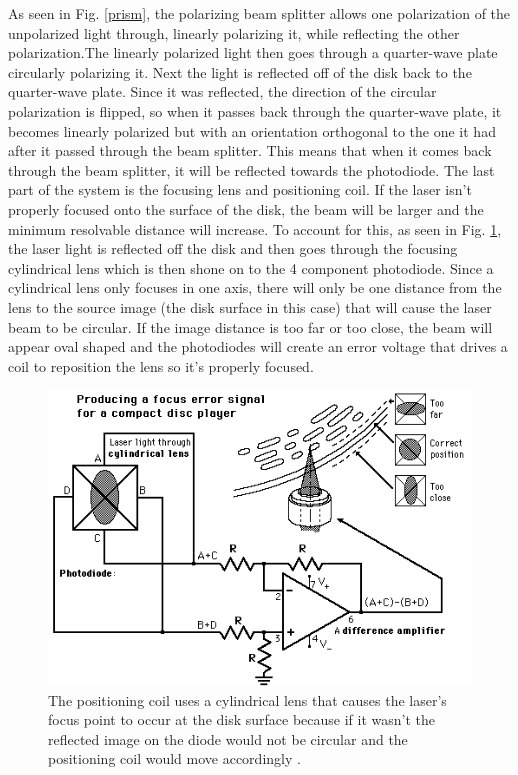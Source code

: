 \documentclass[ notitlepage, numerical, 11pt]{revtex4-1} %
\begin{document}
As seen in Fig. \ref{prism}, the polarizing beam splitter allows one polarization of the unpolarized light through, linearly polarizing it, while reflecting the other polarization.The linearly polarized light then goes through a quarter-wave plate circularly polarizing it. Next the light is reflected off of the disk back to the quarter-wave plate. Since it was reflected, the direction of the circular polarization is flipped, so when it passes back through the quarter-wave plate, it becomes linearly polarized but with an orientation orthogonal to the one it had after it passed through the beam splitter. This means that when it comes back through the beam splitter, it will be reflected towards the photodiode. The last part of the system is the focusing lens and positioning coil. If the laser isn't properly focused onto the surface of the disk, the beam will be larger and the minimum resolvable distance will increase. To account for this, as seen in Fig. \ref{focus}, the laser light is reflected off the disk and then goes through the focusing cylindrical lens which is then shone on to the 4 component photodiode. Since a cylindrical lens only focuses in one axis, there will only be one distance from the lens to the source image (the disk surface in this case) that will cause the laser beam to be circular. If the image distance is too far or too close, the beam will appear oval shaped and the photodiodes will create an error voltage that drives a coil to reposition the lens so it's properly focused.




\begin{figure}[H]
\centerline{\includegraphics[scale=.7]{focus.png}}
\caption{The positioning coil uses a cylindrical lens that causes the laser's focus point to occur at the disk surface because if it wasn't the reflected image on the diode would not be circular and the positioning coil would move accordingly \cite {hyper}.}
\label{focus}
\end{figure} 
\end{document}
